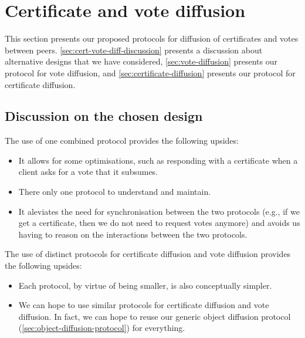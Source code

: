 \section{Certificate and vote diffusion}

This section presents our proposed protocols for diffusion of certificates and
votes between peers. \autoref{sec:cert-vote-diff-discussion} presents a
discussion about alternative designs that we have considered,
\autoref{sec:vote-diffusion} presents our protocol for vote diffusion, and
\autoref{sec:certificate-diffusion} presents our protocol for certificate
diffusion.

\subsection{Discussion on the chosen design}%
\label{sec:cert-vote-diff-discussion}


The use of one combined protocol provides the following upsides:
%
\begin{itemize}
\item It allows for some optimisations, such as responding with a certificate
  when a client asks for a vote that it subsumes.

\item There only one protocol to understand and maintain.

\item It aleviates the need for synchronisation between the two protocols (e.g.,
  if we get a certificate, then we do not need to request votes anymore) and
  avoids us having to reason on the interactions between the two protocols.
\end{itemize}

The use of distinct protocols for certificate diffusion and vote diffusion
provides the following upsides:

\begin{itemize}
\item Each protocol, by virtue of being smaller, is also conceptually simpler.

\item We can hope to use similar protocols for certificate diffusion and vote
  diffusion. In fact, we can hope to reuse our generic object diffusion protocol
  (\autoref{sec:object-diffusion-protocol}) for everything.
\end{itemize}

